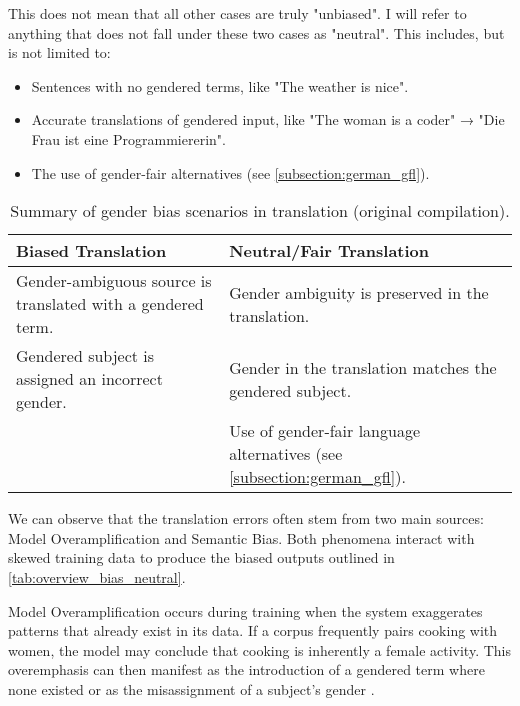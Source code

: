     This does not mean that all other cases are truly "unbiased". I will refer to anything that does not fall under these two cases as "neutral". This includes, but is not limited to:

        \begin{itemize}
        \item Sentences with no gendered terms, like "The weather is nice".
        \item Accurate translations of gendered input, like "The woman is a coder" → "Die Frau ist eine Programmiererin".
        \item The use of gender-fair alternatives (see \autoref{subsection:german_gfl}).
        \end{itemize}

    \begin{table}[htb]
    \centering
    \begin{tabularx}{\linewidth}{X | X}
        \toprule
        \textbf{Biased Translation} & \textbf{Neutral/Fair Translation} \\
        \midrule
        Gender-ambiguous source is translated with a gendered term. & 
        Gender ambiguity is preserved in the translation. \\
        \addlinespace[0.5em]
        Gendered subject is assigned an incorrect gender. & 
        Gender in the translation matches the gendered subject. \\
        \addlinespace[0.5em]
        \multicolumn{1}{c|}{—} & 
        Use of gender-fair language alternatives (see \autoref{subsection:german_gfl}). \\
        \bottomrule
    \end{tabularx}
    \caption{Summary of gender bias scenarios in translation (original compilation).}
    \label{tab:overview_bias_neutral}
    \end{table}

    We can observe that the translation errors often stem from two main sources: Model Overamplification and Semantic Bias. Both phenomena interact with skewed training data to produce the biased outputs outlined in \autoref{tab:overview_bias_neutral}.

    Model Overamplification occurs during training when the system exaggerates patterns that already exist in its data. If a corpus frequently pairs cooking with women, the model may conclude that cooking is inherently a female activity. This overemphasis can then manifest as the introduction of a gendered term where none existed or as the misassignment of a subject’s gender \parencite{ullmannGenderBiasMachine2022,shahPredictiveBiasesNatural2020}.

